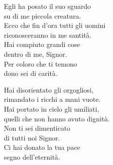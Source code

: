 

\spazio

\strofa Egli ha posato il suo sguardo\\
 su di me piccola creatura.\\
Ecco che fin d'ora tutti gli uomini\\
riconosceranno in me santità.\\
Hai compiuto grandi cose\\
dentro di me, Signor.\\
Per coloro che ti temono\\
dono sei di carità.

\spazio


\spazio

\strofa Hai disorientato gli orgogliosi,\\
rimandato i ricchi a mani vuote.\\
Hai portato in cielo gli umiliati,\\
quelli che non hanno avuto dignità.\\
Non ti sei dimenticato\\
di tutti noi Signor.\\
Ci hai donato la tua pace\\
segno dell'eternità.

\spazio

